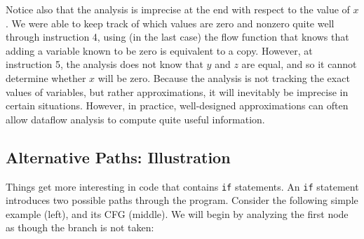 \documentclass[11pt]{article}
\begin{document}
Notice also that the analysis is imprecise at the end with respect to the value of
$x$.  We were able to keep track of which values are zero and nonzero quite well
through instruction 4, using (in the last case) the flow function that knows
that adding a variable known to be zero is equivalent to a copy.
However, at instruction 5, the analysis does not know that $y$ and $z$ are
equal, and so it cannot determine whether $x$ will be zero.  Because the
analysis is not tracking the exact values of variables, but rather
approximations, it will inevitably be imprecise in certain situations.  However,
in practice, well-designed approximations can often allow dataflow analysis to
compute quite useful information.


\subsection{Alternative Paths: Illustration}
\label{sec:if}

Things get more interesting in \WhileThAddr code that contains \texttt{if}
statements.  An \texttt{if} statement introduces two possible paths through the
program. 
Consider the following simple example (left), and its CFG (middle).  We will
begin by analyzing the first node as though the branch is not taken:
\end{document}
